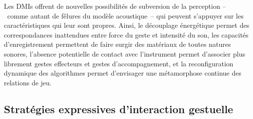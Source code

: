 \indent Les \glspl{DMI} offrent de nouvelles possibilités de subversion de la perception --~comme autant de fêlures du modèle acoustique~-- qui peuvent s'appuyer sur les caractéristiques qui leur sont propres. Ainsi, le découplage énergétique permet des correspondances inattendues entre force du geste et intensité du son, les capacités d'enregistrement permettent de faire surgir des matériaux de toutes natures sonores, l'absence potentielle de contact avec l'instrument permet d'associer plus librement gestes effecteurs et gestes d'accompagnement, et la reconfiguration dynamique des algorithmes permet d'envisager une métamorphose continue des relations de jeu.

\subsection{Stratégies expressives d'interaction gestuelle}

